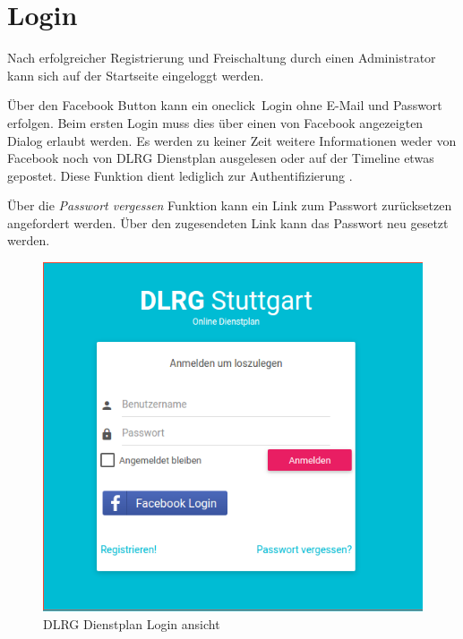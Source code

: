 \chapter{Login}
\label{cha:login}

Nach erfolgreicher Registrierung und Freischaltung durch einen Administrator kann sich auf der Startseite eingeloggt werden. 

\noindent Über den Facebook Button kann ein \glqq oneclick\grqq ~Login ohne E-Mail und Passwort erfolgen. Beim ersten Login muss dies über einen von Facebook angezeigten Dialog erlaubt werden. Es werden zu keiner Zeit weitere Informationen weder von Facebook noch von DLRG Dienstplan ausgelesen oder auf der Timeline etwas gepostet. Diese Funktion dient lediglich zur Authentifizierung \cite{Facebook_Login}.

\vspace*{5mm} \noindent Über die \textit{Passwort vergessen} Funktion kann ein Link zum Passwort zurücksetzen angefordert werden. Über den zugesendeten Link kann das Passwort neu gesetzt werden.

\begin{figure}[h]
 \begin{addmargin}{-0.2\linewidth}
   \centering 
   \includegraphics[width=12cm]{Bilder/view_login.png}
 \end{addmargin} 
 \caption[Login ansicht]{DLRG Dienstplan Login ansicht}
 \label{fig:view_login}
\end{figure}
